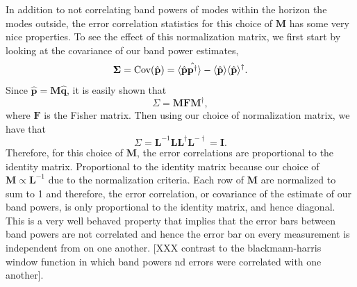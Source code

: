 \documentclass[twocolumn,numberedappendix]{emulateapj} \shorttitle{PSA64}
\newcommand{\phat}{\hat{\mathbf{p}}}
\newcommand{\qhat}{\hat{\mathbf{q}}}
\begin{document}
In addition to not correlating band powers of modes within the horizon the modes
outside, the error correlation statistics for this choice of $\mathbf{M}$ has
some very nice properties. To see the effect of this normalization matrix, we
first start by looking at the covariance of our band power estimates, 
\begin{equation}\label{eqn:err_cov}
    \boldsymbol \Sigma = \text{Cov}(\hat{\mathbf{p}}) = \expval{\hat{\mathbf{p}}\hat{\mathbf{p}^{\dagger}}} -
             \expval{\hat{\mathbf{p}}}\expval{\hat{\mathbf{p}}}^{\dagger}.
\end{equation}
Since $\phat = \mathbf{M}\qhat$, it is easily shown that 
\begin{equation}
    \Sigma = \mathbf{M}\mathbf{F}\mathbf{M}^{\dagger},
\end{equation}
where $\mathbf{F}$ is the Fisher matrix. Then using our choice of normalization
matrix, we have that 
\begin{equation} 
    \Sigma = \mathbf{L}^{-1}\mathbf{L}\mathbf{L}^{\dagger}\mathbf{L}^{-\dagger}
           = \mathbf{I}.
\end{equation}
Therefore, for this choice of $\mathbf{M}$, the error correlations are
proportional to the identity matrix. Proportional to the identity matrix because
our choice of $\mathbf{M} \propto \mathbf{L}^{-1}$ due to the normalization
criteria. Each row of $\mathbf{M}$ are normalized to sum to 1 and therefore,
the error correlation, or covariance of the estimate of our band powers, is only
proportional to the identity matrix, and hence diagonal. This is a very well
behaved property that implies that the error bars between band powers are not
correlated and hence the error bar on every measurement is independent from on
one another. [XXX contrast to the blackmann-harris window function in which
band powers nd errors were correlated with one another].
\end{document}
